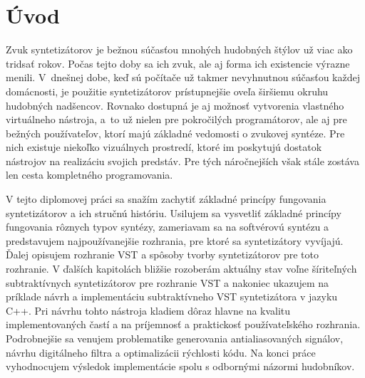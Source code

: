 \chapter*{Úvod}

Zvuk syntetizátorov je bežnou súčasťou mnohých hudobných štýlov už viac ako tridsať rokov. Počas tejto doby sa ich zvuk, ale aj forma ich existencie výrazne menili. V~dnešnej dobe, keď sú počítače už takmer nevyhnutnou súčasťou každej domácnosti, je použitie syntetizátorov prístupnejšie oveľa širšiemu okruhu hudobných nadšencov. Rovnako dostupná je aj možnosť vytvorenia vlastného virtuálneho nástroja, a~to už nielen pre pokročilých programátorov, ale aj pre bežných používateľov, ktorí majú základné vedomosti o zvukovej syntéze. Pre nich existuje niekoľko vizuálnych prostredí, ktoré im poskytujú dostatok nástrojov na realizáciu svojich predstáv. Pre tých náročnejších však stále zostáva len cesta kompletného programovania.

V tejto diplomovej práci sa snažím zachytiť základné princípy fungovania syntetizátorov a ich stručnú históriu. Usilujem sa vysvetliť základné princípy fungovania rôznych typov syntézy, zameriavam sa na softvérovú syntézu a predstavujem najpoužívanejšie rozhrania, pre ktoré sa syntetizátory vyvíjajú. Ďalej opisujem rozhranie VST a spôsoby tvorby syntetizátorov pre toto rozhranie. V ďalších kapitolách bližšie rozoberám aktuálny stav voľne šíriteľných subtraktívnych syntetizátorov pre rozhranie VST a nakoniec ukazujem na príklade návrh a implementáciu subtraktívneho VST syntetizátora v jazyku C++. Pri návrhu tohto nástroja kladiem dôraz hlavne na kvalitu implementovaných častí a na príjemnosť a praktickosť používateľského rozhrania. Podrobnejšie sa venujem problematike generovania antialiasovaných signálov, návrhu digitálneho filtra a optimalizácii rýchlosti kódu. Na konci práce vyhodnocujem výsledok implementácie spolu s odbornými názormi hudobníkov.
